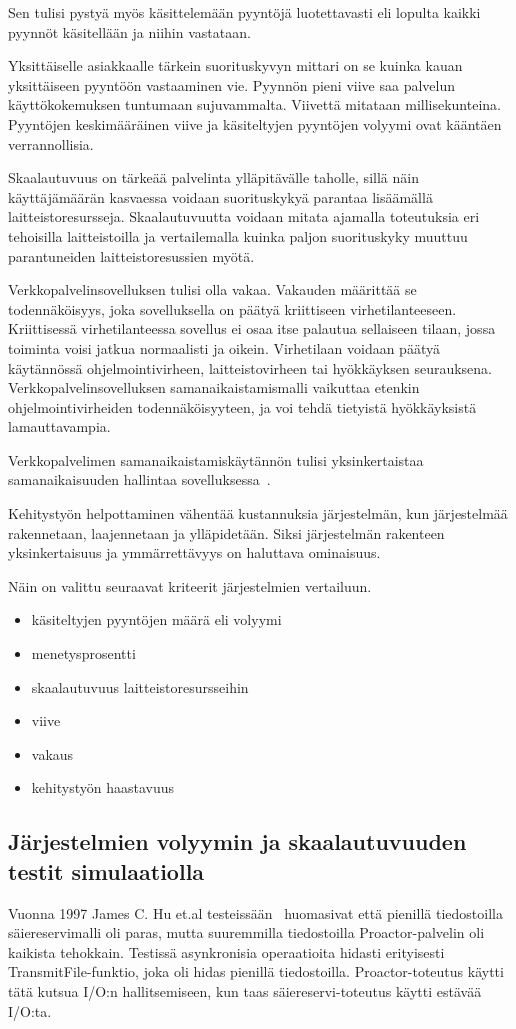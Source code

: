 \documentclass[finnish]{tktltiki2}
\theoremstyle{definition}
\theoremstyle{remark}
\begin{document}
Sen tulisi pystyä myös käsittelemään pyyntöjä
luotettavasti eli lopulta kaikki pyynnöt käsitellään ja niihin vastataan.

Yksittäiselle asiakkaalle tärkein suorituskyvyn mittari on se kuinka kauan
yksittäiseen pyyntöön vastaaminen vie.
Pyynnön pieni viive saa
palvelun käyttökokemuksen tuntumaan sujuvammalta.
Viivettä mitataan millisekunteina.
Pyyntöjen keskimääräinen viive ja käsiteltyjen pyyntöjen
volyymi ovat kääntäen verrannollisia.

Skaalautuvuus on tärkeää palvelinta ylläpitävälle taholle, sillä
näin käyttäjämäärän kasvaessa voidaan suorituskykyä parantaa
lisäämällä laitteistoresursseja. Skaalautuvuutta voidaan
mitata ajamalla toteutuksia eri tehoisilla laitteistoilla
ja vertailemalla kuinka paljon suorituskyky muuttuu 
parantuneiden laitteistoresussien myötä.

Verkkopalvelinsovelluksen tulisi
olla vakaa. Vakauden määrittää
se todennäköisyys, joka sovelluksella on
päätyä kriittiseen virhetilanteeseen. Kriittisessä
virhetilanteessa sovellus ei osaa
itse palautua sellaiseen tilaan, jossa
toiminta voisi jatkua normaalisti ja oikein.
Virhetilaan voidaan päätyä käytännössä
ohjelmointivirheen, laitteistovirheen tai hyökkäyksen seurauksena.
Verkkopalvelinsovelluksen samanaikaistamismalli
vaikuttaa etenkin ohjelmointivirheiden todennäköisyyteen,
ja voi tehdä tietyistä hyökkäyksistä lamauttavampia.


Verkkopalvelimen samanaikaistamiskäytännön tulisi
yksinkertaistaa samanaikaisuuden hallintaa sovelluksessa~\cite{pyarali_proactor_1997}.

Kehitystyön helpottaminen vähentää kustannuksia
järjestelmän, kun järjestelmää rakennetaan, laajennetaan ja ylläpidetään.
Siksi järjestelmän rakenteen yksinkertaisuus ja
ymmärrettävyys on haluttava ominaisuus.

Näin on valittu seuraavat kriteerit
järjestelmien vertailuun.
\begin{itemize}
  \item käsiteltyjen pyyntöjen määrä eli volyymi
  \item menetysprosentti
  \item skaalautuvuus laitteistoresursseihin
  \item viive
  \item vakaus
  \item kehitystyön haastavuus
\end{itemize}

\subsection{Järjestelmien volyymin ja skaalautuvuuden testit simulaatiolla}
Vuonna 1997 James C. Hu et.al testeissään~\cite{hu_measuring_1997} huomasivat
että pienillä tiedostoilla säiereservimalli oli paras,
mutta suuremmilla tiedostoilla Proactor-palvelin oli kaikista tehokkain.
Testissä asynkronisia operaatioita hidasti
erityisesti TransmitFile-funktio, joka oli
hidas pienillä tiedostoilla.
Proactor-toteutus käytti tätä kutsua I/O:n hallitsemiseen,
kun taas säiereservi-toteutus käytti estävää I/O:ta.
\end{document}

